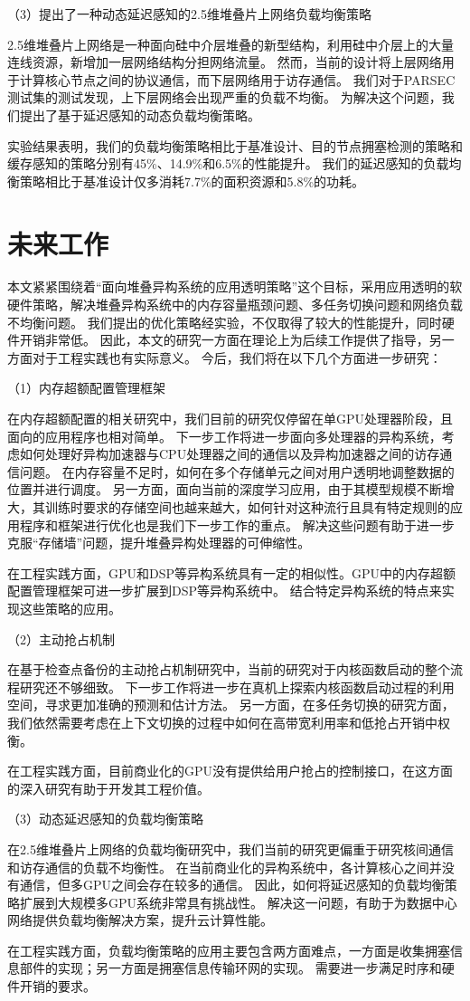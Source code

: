 （3）提出了一种动态延迟感知的2.5维堆叠片上网络负载均衡策略

2.5维堆叠片上网络是一种面向硅中介层堆叠的新型结构，利用硅中介层上的大量连线资源，新增加一层网络结构分担网络流量。
然而，当前的设计将上层网络用于计算核心节点之间的协议通信，而下层网络用于访存通信。
我们对于PARSEC测试集的测试发现，上下层网络会出现严重的负载不均衡。
为解决这个问题，我们提出了基于延迟感知的动态负载均衡策略。

实验结果表明，我们的负载均衡策略相比于基准设计、目的节点拥塞检测的策略和缓存感知的策略分别有45\%、14.9\%和6.5\%的性能提升。
我们的延迟感知的负载均衡策略相比于基准设计仅多消耗7.7\%的面积资源和5.8\%的功耗。



\section{未来工作}
本文紧紧围绕着``面向堆叠异构系统的应用透明策略''这个目标，采用应用透明的软硬件策略，解决堆叠异构系统中的内存容量瓶颈问题、多任务切换问题和网络负载不均衡问题。
我们提出的优化策略经实验，不仅取得了较大的性能提升，同时硬件开销非常低。
因此，本文的研究一方面在理论上为后续工作提供了指导，另一方面对于工程实践也有实际意义。
今后，我们将在以下几个方面进一步研究：

（1）内存超额配置管理框架

在内存超额配置的相关研究中，我们目前的研究仅停留在单GPU处理器阶段，且面向的应用程序也相对简单。
下一步工作将进一步面向多处理器的异构系统，考虑如何处理好异构加速器与CPU处理器之间的通信以及异构加速器之间的访存通信问题。
在内存容量不足时，如何在多个存储单元之间对用户透明地调整数据的位置并进行调度。
另一方面，面向当前的深度学习应用，由于其模型规模不断增大，其训练时要求的存储空间也越来越大，如何针对这种流行且具有特定规则的应用程序和框架进行优化也是我们下一步工作的重点。
解决这些问题有助于进一步克服``存储墙''问题，提升堆叠异构处理器的可伸缩性。

在工程实践方面，GPU和DSP等异构系统具有一定的相似性。GPU中的内存超额配置管理框架可进一步扩展到DSP等异构系统中。
结合特定异构系统的特点来实现这些策略的应用。


（2）主动抢占机制

在基于检查点备份的主动抢占机制研究中，当前的研究对于内核函数启动的整个流程研究还不够细致。
下一步工作将进一步在真机上探索内核函数启动过程的利用空间，寻求更加准确的预测和估计方法。
另一方面，在多任务切换的研究方面，我们依然需要考虑在上下文切换的过程中如何在高带宽利用率和低抢占开销中权衡。

在工程实践方面，目前商业化的GPU没有提供给用户抢占的控制接口，在这方面的深入研究有助于开发其工程价值。

（3）动态延迟感知的负载均衡策略

在2.5维堆叠片上网络的负载均衡研究中，我们当前的研究更偏重于研究核间通信和访存通信的负载不均衡性。
在当前商业化的异构系统中，各计算核心之间并没有通信，但多GPU之间会存在较多的通信。
因此，如何将延迟感知的负载均衡策略扩展到大规模多GPU系统非常具有挑战性。
解决这一问题，有助于为数据中心网络提供负载均衡解决方案，提升云计算性能。

在工程实践方面，负载均衡策略的应用主要包含两方面难点，一方面是收集拥塞信息部件的实现；另一方面是拥塞信息传输环网的实现。
需要进一步满足时序和硬件开销的要求。




